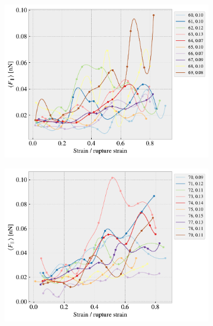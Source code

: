\begin{figure}[H]\ContinuedFloat
    \centering
    \begin{subfigure}[b]{0.49\textwidth}
        \centering
        \includegraphics[width=\textwidth]{figures/stretch_profiles/RW/SP_6_RW.pdf}
        \caption{}
    \end{subfigure}
    \hfill
    \begin{subfigure}[b]{0.49\textwidth}
        \centering
        \includegraphics[width=\textwidth]{figures/stretch_profiles/RW/SP_7_RW.pdf}
        \caption{}
    \end{subfigure}
    \hfill
    \begin{subfigure}[b]{0.49\textwidth}

\end{subfigure}
\end{figure}
